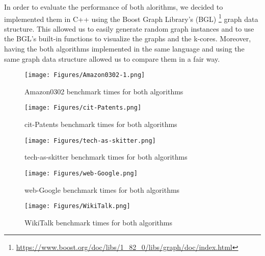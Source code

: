 \label{Evaluation}

In order to evaluate the performance of both alorithms, we decided to implemented them in C++ using the Boost Graph Library's (BGL) \footnote{\url{https://www.boost.org/doc/libs/1_82_0/libs/graph/doc/index.html}} graph data structure. This allowed us to easily generate random graph instances and to use the BGL's built-in functions to visualize the graphs and the k-cores. Moreover, having the both algorithms implemented in the same language and using the same graph data structure allowed us to compare them in a fair way.

\begin{figure}[H]
    \centering
    \texttt{[image: Figures/Amazon0302-1.png]}
    \caption{Amazon0302 benchmark times for both algorithms}
    \label{fig:amazon}
\end{figure}

\begin{figure}[H]
    \centering
    \texttt{[image: Figures/cit-Patents.png]}
    \caption{cit-Patents benchmark times for both algorithms}
    \label{fig:cit-patents}
\end{figure}

\begin{figure}[H]
    \centering
    \texttt{[image: Figures/tech-as-skitter.png]}
    \caption{tech-as-skitter benchmark times for both algorithms}
    \label{fig:tech-as-skitter}
\end{figure}

\begin{figure}[H]
    \centering
    \texttt{[image: Figures/web-Google.png]}
    \caption{web-Google benchmark times for both algorithms}
    \label{fig:web-google}
\end{figure}

\begin{figure}[H]
    \centering
    \texttt{[image: Figures/WikiTalk.png]}
    \caption{WikiTalk benchmark times for both algorithms}
    \label{fig:wikitalk}
\end{figure}